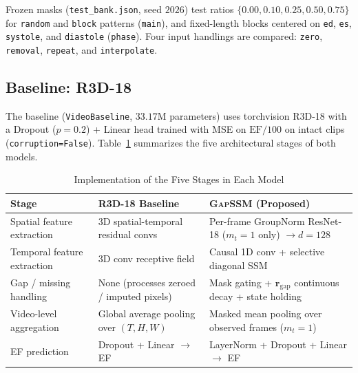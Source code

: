 \documentclass[conference]{IEEEtran}
\begin{document}
Frozen masks (\texttt{test\_bank.json}, seed $2026$) test ratios $\{0.00, 0.10, 0.25, 0.50, 0.75\}$ for \texttt{random} and \texttt{block} patterns (\texttt{main}), and fixed-length blocks centered on \texttt{ed}, \texttt{es}, \texttt{systole}, and \texttt{diastole} (\texttt{phase}). Four input handlings are compared: \texttt{zero}, \texttt{removal}, \texttt{repeat}, and \texttt{interpolate}.

\subsection{Baseline: R3D-18}
The baseline (\texttt{VideoBaseline}, $33.17$M parameters) uses torchvision R3D-18 with a Dropout ($p=0.2$) + Linear head trained with MSE on $\text{EF}/100$ on intact clips (\texttt{corruption=False}). Table~\ref{tab:stages} summarizes the five architectural stages of both models.

\begin{table}[t]
\centering
\caption{Implementation of the Five Stages in Each Model}
\label{tab:stages}
\setlength{\tabcolsep}{3pt}
\begin{tabular}{p{1.9cm}p{2.9cm}p{3.2cm}}
\toprule
Stage & R3D-18 Baseline & \textsc{GapSSM} (Proposed) \\
\midrule
Spatial feature extraction & 3D spatial-temporal residual convs & Per-frame GroupNorm ResNet-18 ($m_t=1$ only) $\rightarrow d=128$ \\
Temporal feature extraction & 3D conv receptive field & Causal 1D conv + selective diagonal SSM \\
Gap / missing handling & None (processes zeroed / imputed pixels) & Mask gating + $\mathbf{r}_{\text{gap}}$ continuous decay + state holding \\
Video-level aggregation & Global average pooling over $(T,H,W)$ & Masked mean pooling over observed frames ($m_t=1$) \\
EF prediction & Dropout + Linear $\rightarrow$ EF & LayerNorm + Dropout + Linear $\rightarrow$ EF \\
\bottomrule
\end{tabular}
\end{table}
\end{document}
